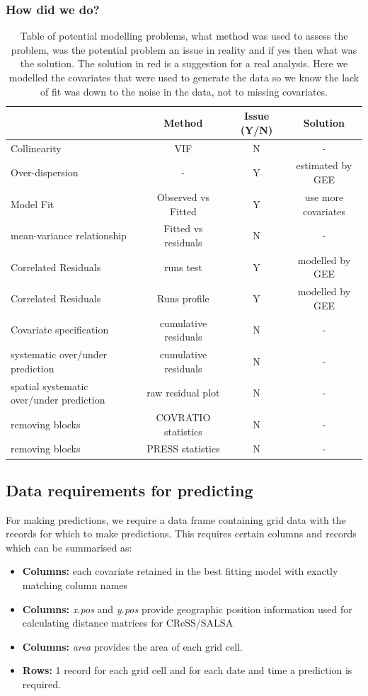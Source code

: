 \begin{frame}
\frametitle{How did we do?}
\begin{table}[h]
\scriptsize
\caption{Table of potential modelling problems, what method was used to assess the problem, was the potential problem an issue in reality and if yes then what was the solution.  The solution in red is a suggestion for a real analysis.  Here we modelled the covariates that were used to generate the data so we know the lack of fit was down to the noise in the data, not to missing covariates.}
\begin{tabular}{l|c|c|c}
\textbf{} & \textbf{Method} & \textbf{Issue (Y/N)} & \textbf{Solution}\\
\hline
Collinearity & VIF & N & -\\
Over-dispersion& - & Y & estimated by GEE\\
Model Fit & Observed vs Fitted & Y & {\color{red} use more covariates}\\
mean-variance relationship & Fitted vs residuals & N & -\\
Correlated Residuals & runs test & Y & modelled by GEE\\
Correlated Residuals & Runs profile & Y & modelled by GEE\\
Covariate specification & cumulative residuals & N & -\\
systematic over/under prediction & cumulative residuals & N & -\\
spatial systematic over/under prediction & raw residual plot & N & -\\
removing blocks & COVRATIO statistics & N & - \\
removing blocks & PRESS statistics & N & - \\
\end{tabular}
\label{tab:fitstats}
\end{table}

\end{frame}
\label{sec:preds}
\subsection{Data requirements for predicting}
For making predictions, we require a data frame containing grid data with the records for which to make predictions. This requires certain columns and records which can be summarised as: \\
\begin{itemize}
\item{\textbf{Columns:} each covariate retained in the best fitting model with exactly matching column names}
\item{\textbf{Columns:} \textit{x.pos} and \textit{y.pos} provide geographic position information used for calculating distance matrices for CReSS/SALSA}
\item{\textbf{Columns:} \textit{area} provides the area of each grid cell.}
\item{\textbf{Rows:} 1 record for each grid cell and for each date and time a prediction is required.}
\end{itemize}

